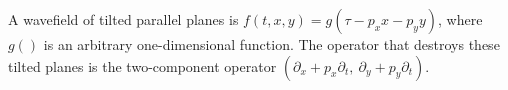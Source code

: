 \par
A wavefield of tilted parallel planes is
$f(t, x,y)= g(\tau -p_x x -p_y y)$, where $g()$ is
an arbitrary one-dimensional function.
The operator that destroys these tilted planes
is the two-component operator
$(\partial_x + p_x \partial_t,\   \partial_y + p_y \partial_t)$.

\par\noindent
{}

